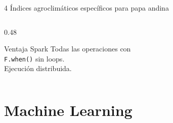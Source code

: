 \documentclass[14pt,aspectratio=169]{beamer}
\begin{document}
\begin{frame}{4 \'Indices agroclim\'aticos espec\'ificos para papa andina}
\begin{columns}[T]
\begin{column}{0.48\textwidth}
      \vspace{0.3em}
      \begin{exampleblock}{Ventaja Spark}
        \footnotesize
        Todas las operaciones con\\
        \texttt{F.when()} sin loops.\\
        Ejecuci\'on distribuida.
      \end{exampleblock}
    \end{column}
  \end{columns}
\end{frame}

\section{Machine Learning}
\end{document}
